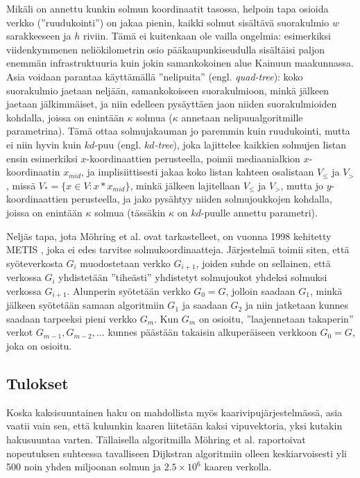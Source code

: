 \documentclass[finnish]{tktltiki2}
\theoremstyle{definition}
\theoremstyle{remark}
\begin{document}
 Mikäli on annettu kunkin solmun koordinaatit tasossa, helpoin tapa osioida verkko (''ruudukointi'') on jakaa pienin, kaikki solmut sisältävä suorakulmio $w$ sarakkeeseen ja $h$ riviin. Tämä ei kuitenkaan ole vailla ongelmia: esimerkiksi viidenkymmenen neliökilometrin osio pääkaupunkiseudulla sisältäisi paljon enemmän infrastruktuuria kuin jokin samankokoinen alue Kainuun maakunnassa. Asia voidaan parantaa käyttämällä ''nelipuita'' (engl. \textit{quad-tree}): koko suorakulmio jaetaan neljään, samankokoiseen suorakulmioon, minkä jälkeen jaetaan jälkimmäiset, ja niin edelleen pysäyttäen jaon niiden suorakulmioiden kohdalla, joissa on enintään $\kappa$ solmua ($\kappa$ annetaan nelipuualgoritmille parametrina). Tämä ottaa solmujakauman jo paremmin kuin ruudukointi, mutta ei niin hyvin kuin $kd$-puu (engl. \textit{$kd$-tree}), joka lajittelee kaikkien solmujen listan ensin esimerkiksi $x$-koordinaattien perusteella, poimii mediaanialkion $x$-koordinaatin $x_{mid}$, ja implisiittisesti jakaa koko listan kahteen osalistaan $V_{\leq}$ ja $V_{>}$, missä $V_{\ast} = \{ x \in V \colon x \ast x_{mid}\}$, minkä jälkeen lajitellaan $V_{\leq}$ ja $V_{>}$, mutta jo $y$-koordinaattien perusteella, ja jako pysähtyy niiden solmujoukkojen kohdalla, joissa on enintään $\kappa$ solmua (tässäkin $\kappa$ on $kd$-puulle annettu parametri).
 
 Neljäs tapa, jota Möhring et al. ovat tarkastelleet, on vuonna 1998 kehitetty METIS \cite{Karypis98}, joka ei edes tarvitse solmukoordinaatteja. Järjestelmä toimii siten, että syöteverkosta $G_i$ muodostetaan verkko $G_{i + 1}$, joiden suhde on sellainen, että verkossa $G_i$ yhdistetään ''tiheästi'' yhdistetyt solmujoukot yhdeksi solmuksi verkossa $G_{i + 1}$. Alunperin syötetään verkko $G_0 = G$, jolloin saadaan $G_1$, minkä jälkeen syötetään samaan algoritmiin $G_1$ ja saadaan $G_2$ ja niin jatketaan kunnes saadaan tarpeeksi pieni verkko $G_m$. Kun $G_m$ on osioitu, ''laajennetaan takaperin'' verkot $G_{m - 1}, G_{m - 2}, \dots$ kunnes päästään takaisin alkuperäiseen verkkoon $G_0 = G$, joka on osioitu.
 
\subsection{Tulokset}
Koska kaksisuuntainen haku on mahdollista myös kaarivipujärjestelmässä, asia vaatii vain sen, että kuhunkin kaaren liitetään kaksi vipuvektoria, yksi kutakin hakusuuntaa varten. Tällaisella algoritmilla Möhring et al. raportoivat nopeutuksen suhteessa tavalliseen Dijkstran algoritmiin olleen keskiarvoisesti yli 500 noin yhden miljoonan solmun ja $2.5 \times 10^6$ kaaren verkolla.
 
\end{document}
